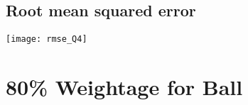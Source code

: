 \documentclass[a4paper, 12pt]{article}
\begin{document}
\subsection{Root mean squared error}

\begin{center}
\begin{minipage}{0.7\linewidth}
    \texttt{[image: rmse\_Q4]}
    \label{fig:Q1_3}
\end{minipage}
\end{center}

\section{80\% Weightage for Ball}
\end{document}
